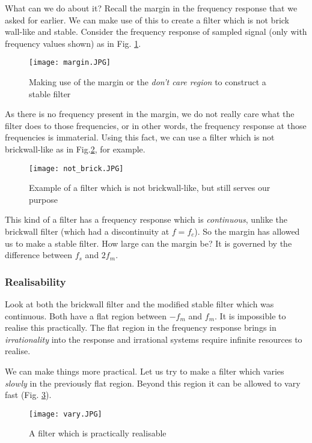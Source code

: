 What can we do about it? Recall the margin in the frequency response that we asked for earlier. We can make use of this to create a filter which is not brick wall-like and stable. Consider the frequency response of sampled signal (only with frequency values shown) as in Fig. \ref{margin}. 
\begin{figure}[h] 
        \centering
        
                \texttt{[image: margin.JPG]}
                \caption{Making use of the margin or the \textit{don't care region} to construct a stable filter}
                \label{margin}
        
\end{figure}
As there is no frequency present in the margin, we do not really care what the filter does to those frequencies, or in other words, the frequency response at those frequencies is immaterial. Using this fact, we can use a filter which is not brickwall-like as in Fig.\ref{not_brick}, for example. 
\begin{figure}[h]
        \centering
        
                \texttt{[image: not\_brick.JPG]}
                \caption{Example of a filter which is not brickwall-like, but still serves our purpose}
                \label{not_brick}
        
\end{figure}
This kind of a filter has a frequency response which is \textit{continuous}, unlike the brickwall filter (which had a discontinuity at $f = f_{c}$). So the margin has allowed us to make a stable filter. How large can the margin be? It is governed by the difference between $f_{s}$ and $2f_{m}$. 
\newpage
\subsubsection{Realisability}
Look at both the brickwall filter and the modified stable filter which was continuous. Both have a flat region between $-f_{m}$ and $f_{m}$. It is impossible to realise this practically. The flat region in the frequency response brings in \textit{irrationality} into the response and irrational systems require infinite resources to realise. 

We can make things more practical. Let us try to make a filter which varies \textit{slowly} in the previously flat region. Beyond this region it can be allowed to vary fast (Fig. \ref{vary}).
\begin{figure}[h] 
        \centering
        
                \texttt{[image: vary.JPG]}
                \caption{A filter which is practically realisable}
                \label{vary}
        
\end{figure}

